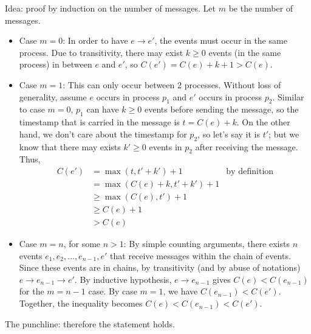 Idea: proof by induction on the number of messages. Let $m$ be the number of messages.

\begin{itemize}
\item
Case $m = 0$:
In order to have $e \rightarrow e'$, the events must occur in the same process.
Due to transitivity, there may exist $k \ge 0$ events (in the same process) in between $e$ and $e'$, so $C(e') = C(e) + k+1 > C(e)$.
\item
Case $m = 1$:
This can only occur between 2 processes.
Without loss of generality, assume $e$ occurs in process $p_1$ and $e'$ occurs in process $p_2$.
Similar to case $m=0$, $p_1$ can have $k \ge 0$ events before sending the message, so the timestamp that is carried in the message is $t = C(e) + k$.
On the other hand, we don't care about the timestamp for $p_2$, so let's say it is $t'$; but we know that there may exists $k' \ge 0$ events in $p_2$ after receiving the message.
Thus,
\begin{align*}
C(e') &= \max(t, t' + k') + 1 & \text{by definition} \\
	&= \max(C(e) + k, t' + k') + 1 \\
	&\ge \max(C(e), t') + 1 \\
	&\ge C(e) + 1 \\
	&> C(e)
\end{align*}
\item
Case $m = n$, for some $n > 1$:
By simple counting arguments, there exists $n$ events $e_1, e_2, \ldots, e_{n-1},e'$ that receive messages within the chain of events.
Since these events are in chains, by transitivity (and by abuse of notations) $e \rightarrow e_{n-1} \rightarrow e'$.
By inductive hypothesis, $e \rightarrow e_{n-1}$ gives $C(e) < C(e_{n-1})$ for the $m = n-1$ case.
By case $m = 1$, we have $C(e_{n-1}) < C(e')$.
Together, the inequality becomes $C(e) < C(e_{n-1}) < C(e')$.
\end{itemize}
The punchline: therefore the statement holds.
